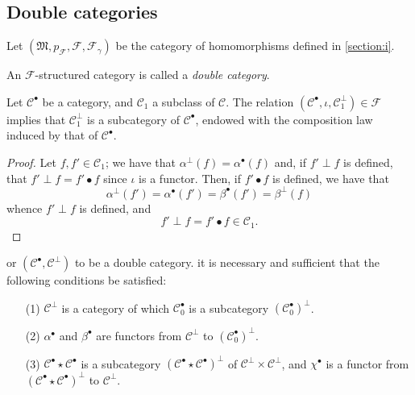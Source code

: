 \documentclass[a4paper,fleqn]{article}
\theoremstyle{plain}
\newenvironment{proposition}[1]
  {\renewcommand\theinnerproposition{#1}\innerproposition}
  {\endinnerproposition}
\newenvironment{corollary}[1]
  {\renewcommand\theinnercorollary{#1}\innercorollary}
  {\endinnercorollary}
\theoremstyle{definition}
\newenvironment{definition}[1]
  {\renewcommand\theinnerdefinition{#1}\innerdefinition}
  {\endinnerdefinition}
\newcommand{\CC}{\mathcal{C}}
\newcommand{\MM}{\mathfrak{M}}
\newcommand{\FF}{\mathcal{F}}
\begin{document}
\subsection{Double categories}
\label{section:ii.4}

Let $(\MM,p_\FF,\FF,\FF_\gamma)$ be the category of homomorphisms defined in \cref{section:i}.

\begin{definition}{10}
\label{definition:ii-10}
  An $\FF$-structured category is called a \emph{double category}.
\end{definition}

\begin{proposition}{9}
\label{proposition:ii-9}
  Let $\CC^\bullet$ be a category, and $\CC_1$ a subclass of $\CC$.
  The relation $(\CC^\bullet,\iota,\CC_1^\perp)\in\FF$ implies that $\CC_1^\perp$ is a subcategory of $\CC^\bullet$, endowed with the composition law induced by that of $\CC^\bullet$.
\end{proposition}

\begin{proof}
  Let $f,f'\in\CC_1$;
  we have that $\alpha^\perp(f)=\alpha^\bullet(f)$ and, if $f'\perp f$ is defined, that $f'\perp f=f'\bullet f$ since $\iota$ is a functor.
  Then, if $f'\bullet f$ is defined, we have that
  \[
    \alpha^\perp(f')
    = \alpha^\bullet(f')
    = \beta^\bullet(f')
    = \beta^\perp(f)
  \]
  whence $f'\perp f$ is defined, and
  \[
    f'\perp f
    = f'\bullet f
    \in\CC_1.
  \]
\end{proof}

\begin{corollary}
  For $(\CC^\bullet,\CC^\perp)$ to be a double category. it is necessary and sufficient that the following conditions be satisfied:
  \begin{enumerate}
    \item[\normalfont(1)]
      $\CC^\perp$ is a category of which $\CC_0^\bullet$ is a subcategory $(\CC_0^\bullet)^\perp$.
    \item[\normalfont(2)]
      $\alpha^\bullet$ and $\beta^\bullet$ are functors from $\CC^\perp$ to $(\CC_0^\bullet)^\perp$.
    \item[\normalfont(3)]
      $\CC^\bullet\star\CC^\bullet$ is a subcategory $(\CC^\bullet\star\CC^\bullet)^\perp$ of $\CC^\perp\times\CC^\perp$, and $\chi^\bullet$ is a functor from $(\CC^\bullet\star\CC^\bullet)^\perp$ to $\CC^\perp$.
  \end{enumerate}
\end{corollary}
\end{document}
